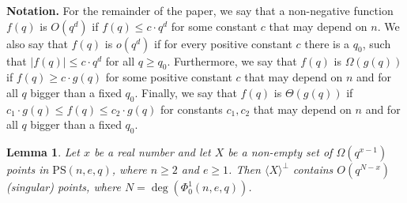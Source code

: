 \documentclass[11pt]{article}
\newtheorem{lemma}[thm]{Lemma}
\newcommand{\PS}{\mathrm{PS}}
\renewcommand{\le}{\leqslant}
\renewcommand{\leq}{\leqslant}
\renewcommand{\ge}{\geqslant}
\renewcommand{\geq}{\geqslant}
\begin{document}
\textbf{Notation.} For the remainder of the paper, we say that a non-negative function $f(q)$ is $O(q^d)$ if $f(q) \le c\cdot q^d$ for some constant $c$ that may depend on $n$. We also say that $f(q)$ is $o(q^d)$ if for every positive constant $c$ there is a $q_0$, such that $|f(q)|\le c\cdot q^d$ for all $q\ge q_0$.  Furthermore, we say that $f(q)$ is $\Omega(g(q))$ if $f(q) \geq c\cdot g(q)$ for some positive constant $c$ that may depend on $n$ and for all $q$ bigger than a fixed $q_0$. 
Finally, we say that $f(q)$ is $\Theta(g(q))$ if $c_1\cdot g(q)\leq f(q) \leq c_2\cdot g(q)$ for constants $c_1,c_2$ that may depend on $n$ and for all $q$ bigger than a fixed $q_0$. 


\begin{lemma} \label{L: points in X perp}
    Let $x$ be a real number and let $X$ be a non-empty set of $\Omega(q^{x-1})$ points in $\PS(n,e,q)$, where $n\geq 2$ and $e\geq 1$. Then $\langle X \rangle^\perp$ contains $O(q^{N-x})$ (singular) points, where $N= \deg(\Phi_0^1(n,e,q))$. 
\end{lemma}
\end{document}
